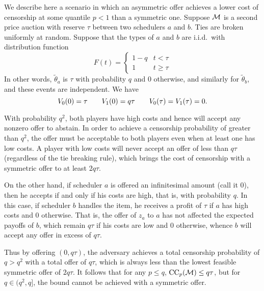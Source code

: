 \begin{example}
  \label{asymmetric-offer}

  We describe here a scenario in which an asymmetric offer achieves a lower cost of censorship at some quantile $p<1$ than a symmetric one.
  Suppose $\mathcal{M}$ is a second price auction with reserve $\tau$ between two schedulers $a$ and $b$.
  Ties are broken uniformly at random.
  Suppose that the types of $a$ and $b$ are i.i.d.~with distribution function
  \[
    F(t) = \left\{\begin{array}{ll}
      1-q & t<\tau \\
      1 & t \geq\tau
    \end{array}\right.
  \]
  In other words, $\tilde\theta_a$ is $\tau$ with probability $q$ and $0$ otherwise, and similarly for $\tilde\theta_b$, and these events are independent.
  We have
  \[
    V_0(0) = \tau \qquad V_1(0) = q\tau  \qquad V_0(\tau) = V_1(\tau) = 0.
  \]

  With probability $q^2$, both players have high costs and hence will accept any nonzero offer to abstain.
  In order to achieve a censorship probability of greater than $q^2$, the offer must be acceptable to both players even when at least one has low costs.
  A player with low costs will never accept an offer of less than $q\tau$ (regardless of the tie breaking rule), which brings the cost of censorship with a symmetric offer to at least $2q\tau$.

  On the other hand, if scheduler $a$ is offered an infinitesimal amount (call it $0$), then he accepts if and only if his costs are high, that is, with probability $q$.
  In this case, if scheduler $b$ handles the item, he receives a profit of $\tau$ if $a$ has high costs and $0$ otherwise.
  That is, the offer of $z_a$ to $a$ has not affected the expected payoffs of $b$, which remain $q\tau$ if his costs are low and $0$ otherwise, whence $b$ will accept any offer in excess of $q\tau$.

  Thus by offering $(0,q\tau)$, the adversary achieves a total censorship probability of $q>q^2$ with a total offer of $q\tau$, which is always less than the lowest feasible symmetric offer of $2q\tau$.
  It follows that for any $p\leq q$, $\mathrm{CC}_{p}(\mathcal{M})\leq q\tau$, but for $q\in(q^2,q]$, the bound cannot be achieved with a symmetric offer.

\end{example}

